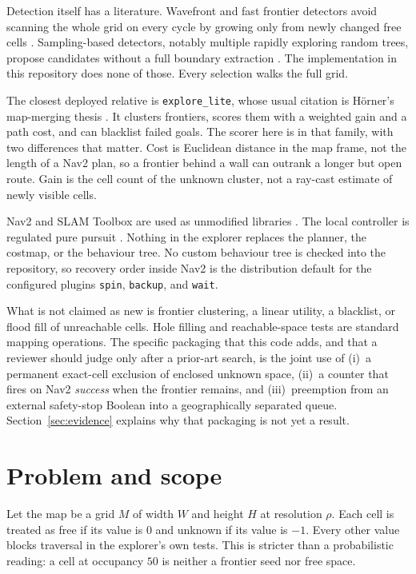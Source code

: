 \documentclass[11pt]{article}
\begin{document}
Detection itself has a literature. Wavefront and fast frontier detectors avoid scanning the whole grid on every cycle by growing only from newly changed free cells \cite{keidar2014,quin2014}. Sampling-based detectors, notably multiple rapidly exploring random trees, propose candidates without a full boundary extraction \cite{umari2017}. The implementation in this repository does none of those. Every selection walks the full grid.

The closest deployed relative is \texttt{explore\_lite}, whose usual citation is H\"orner's map-merging thesis \cite{horner2016}. It clusters frontiers, scores them with a weighted gain and a path cost, and can blacklist failed goals. The scorer here is in that family, with two differences that matter. Cost is Euclidean distance in the map frame, not the length of a Nav2 plan, so a frontier behind a wall can outrank a longer but open route. Gain is the cell count of the unknown cluster, not a ray-cast estimate of newly visible cells.

Nav2 and SLAM Toolbox are used as unmodified libraries \cite{macenski2020,macenski2021}. The local controller is regulated pure pursuit \cite{macenski2023}. Nothing in the explorer replaces the planner, the costmap, or the behaviour tree. No custom behaviour tree is checked into the repository, so recovery order inside Nav2 is the distribution default for the configured plugins \texttt{spin}, \texttt{backup}, and \texttt{wait}.

What is not claimed as new is frontier clustering, a linear utility, a blacklist, or flood fill of unreachable cells. Hole filling and reachable-space tests are standard mapping operations. The specific packaging that this code adds, and that a reviewer should judge only after a prior-art search, is the joint use of (i)~a permanent exact-cell exclusion of enclosed unknown space, (ii)~a counter that fires on Nav2 \emph{success} when the frontier remains, and (iii)~preemption from an external safety-stop Boolean into a geographically separated queue. Section~\ref{sec:evidence} explains why that packaging is not yet a result.

\section{Problem and scope}
\label{sec:problem}
Let the map be a grid $M$ of width $W$ and height $H$ at resolution $\rho$. Each cell is treated as free if its value is $0$ and unknown if its value is $-1$. Every other value blocks traversal in the explorer's own tests. This is stricter than a probabilistic reading: a cell at occupancy $50$ is neither a frontier seed nor free space.
\end{document}
